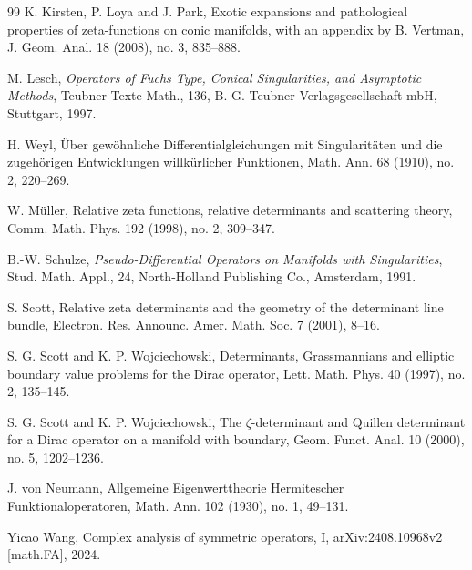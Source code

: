 \documentclass[12pt]{amsart}
\theoremstyle{plain}
\theoremstyle{definition}
\theoremstyle{remark}
\numberwithin{equation}{section} \numberwithin{figure}{section}
\begin{document}
\begin{thebibliography}{99}
K. Kirsten, P. Loya and J. Park,
Exotic expansions and pathological properties of zeta-functions on conic
manifolds, with an appendix by B. Vertman,
J. Geom. Anal. 18 (2008), no. 3, 835--888.

M. Lesch,
\emph{Operators of Fuchs Type, Conical Singularities, and Asymptotic Methods},
Teubner-Texte Math., 136,
B. G. Teubner Verlagsgesellschaft mbH, Stuttgart, 1997.

H. Weyl,
{\"U}ber gew{\"o}hnliche Differentialgleichungen mit Singularit{\"a}ten und die
zugeh{\"o}rigen Entwicklungen willk{\"u}rlicher Funktionen,
Math. Ann. 68 (1910), no. 2, 220--269.

W. M{\"u}ller,
Relative zeta functions, relative determinants and scattering theory,
Comm. Math. Phys. 192 (1998), no. 2, 309--347.

B.-W. Schulze,
\emph{Pseudo-Differential Operators on Manifolds with Singularities},
Stud. Math. Appl., 24,
North-Holland Publishing Co., Amsterdam, 1991.

S. Scott,
Relative zeta determinants and the geometry of the determinant line bundle,
Electron. Res. Announc. Amer. Math. Soc. 7 (2001), 8--16.

S. G. Scott and K. P. Wojciechowski,
Determinants, Grassmannians and elliptic boundary value problems for the
Dirac operator,
Lett. Math. Phys. 40 (1997), no. 2, 135--145.

S. G. Scott and K. P. Wojciechowski,
The \(\zeta\)-determinant and Quillen determinant for a Dirac operator on a
manifold with boundary,
Geom. Funct. Anal. 10 (2000), no. 5, 1202--1236.

J. von Neumann,
Allgemeine Eigenwerttheorie Hermitescher Funktionaloperatoren,
Math. Ann. 102 (1930), no. 1, 49--131.

Yicao Wang,
Complex analysis of symmetric operators, I,
arXiv:2408.10968v2 [math.FA], 2024.
\end{thebibliography}
\end{document}
